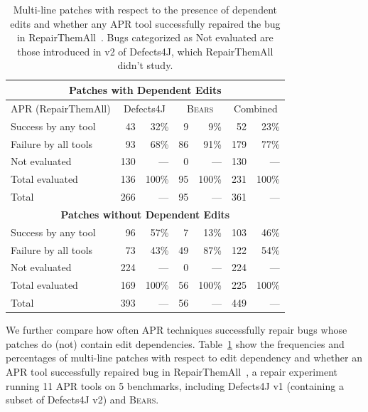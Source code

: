 \documentclass[10pt, conference]{IEEEtran}
\newcommand\bears{\textsc{Bears}\xspace}
\begin{document}
\begin{table}
{\begin{center}
	\begin{tabular}{l  rr  rr  rr}
		\toprule
		\multicolumn{7}{c}{\textbf{Patches with Dependent Edits}} \\
		\midrule
		APR (RepairThemAll) & \multicolumn{2}{c}{Defects4J} & \multicolumn{2}{c}{\bears} & \multicolumn{2}{c}{Combined} \\
		\midrule
		Success by any tool & 43 & 32\% & 9 & 9\% & 52 & 23\% \\
		Failure by all tools & 93 & 68\% & 86 & 91\% & 179 & 77\% \\
		Not evaluated & 130 & --- & 0 & --- & 130 & --- \\
		\midrule
		Total evaluated & 136 & 100\% & 95 & 100\% & 231 & 100\% \\
		Total & 266 & --- & 95 & --- & 361 & --- \\
		\midrule
		\multicolumn{7}{c}{\textbf{Patches without Dependent Edits}} \\
		\midrule
		Success by any tool & 96 & 57\% & 7 & 13\% & 103 & 46\% \\
		Failure by all tools & 73 & 43\% & 49 & 87\% & 122 & 54\% \\
		Not evaluated & 224 & --- & 0 & --- & 224 & --- \\
		\midrule
		Total evaluated & 169 & 100\% & 56 & 100\% & 225 & 100\% \\
		Total & 393 & --- & 56 & --- & 449 & --- \\
		\bottomrule
	\end{tabular}
 \end{center}
}
	\caption{Multi-line patches with respect to the presence of 
	dependent edits and whether any APR tool successfully 
	repaired the bug in RepairThemAll~\cite{durieux-repair-them-all}.
	Bugs categorized as {\normalfont Not evaluated} are those introduced in 
	v2 of Defects4J, which RepairThemAll didn't study.}
	\label{tab:dependency-repair-contingency-table}
\end{table}

We further compare how often APR techniques 
successfully repair bugs whose patches do (not) contain edit dependencies.
Table~\ref{tab:dependency-repair-contingency-table}
show the frequencies and percentages of multi-line patches with respect to edit dependency 
and whether an APR tool successfully repaired bug in 
RepairThemAll~\cite{durieux-repair-them-all}, a repair experiment running 
11 APR tools on 5 benchmarks, including Defects4J v1 (containing a subset of Defects4J v2) and \bears.
\end{document}
